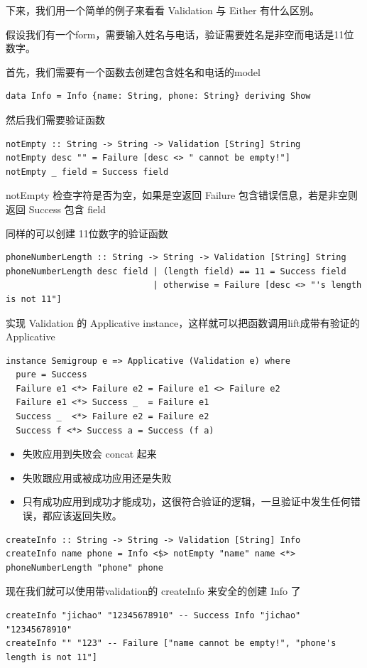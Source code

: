\documentclass[11pt]{tufte-book}
\begin{document}
下来，我们用一个简单的例子来看看 Validation 与 Either 有什么区别。

假设我们有一个form，需要输入姓名与电话，验证需要姓名是非空而电话是11位数字。

首先，我们需要有一个函数去创建包含姓名和电话的model
\begin{verbatim}
data Info = Info {name: String, phone: String} deriving Show
\end{verbatim}

然后我们需要验证函数
\begin{verbatim}
notEmpty :: String -> String -> Validation [String] String
notEmpty desc "" = Failure [desc <> " cannot be empty!"]
notEmpty _ field = Success field
\end{verbatim}
notEmpty 检查字符是否为空，如果是空返回 Failure 包含错误信息，若是非空则返回 Success 包含 field

同样的可以创建 11位数字的验证函数
\begin{verbatim}
phoneNumberLength :: String -> String -> Validation [String] String
phoneNumberLength desc field | (length field) == 11 = Success field
                             | otherwise = Failure [desc <> "'s length is not 11"]
\end{verbatim}
实现 Validation 的 Applicative instance，这样就可以把函数调用lift成带有验证的 Applicative
\begin{verbatim}
instance Semigroup e => Applicative (Validation e) where
  pure = Success
  Failure e1 <*> Failure e2 = Failure e1 <> Failure e2
  Failure e1 <*> Success _  = Failure e1
  Success _  <*> Failure e2 = Failure e2
  Success f <*> Success a = Success (f a)
\end{verbatim}
\begin{itemize}
\item 失败应用到失败会 concat 起来
\item 失败跟应用或被成功应用还是失败
\item 只有成功应用到成功才能成功，这很符合验证的逻辑，一旦验证中发生任何错误，都应该返回失败。
\end{itemize}

\begin{verbatim}
createInfo :: String -> String -> Validation [String] Info
createInfo name phone = Info <$> notEmpty "name" name <*> phoneNumberLength "phone" phone
\end{verbatim}

现在我们就可以使用带validation的 createInfo 来安全的创建 Info 了

\begin{verbatim}
createInfo "jichao" "12345678910" -- Success Info "jichao" "12345678910"
createInfo "" "123" -- Failure ["name cannot be empty!", "phone's length is not 11"]
\end{verbatim}
\end{document}

